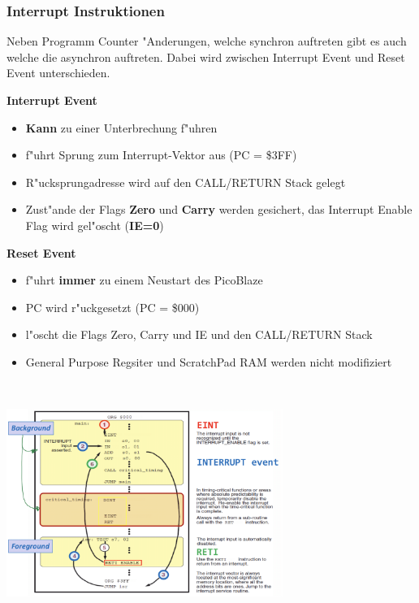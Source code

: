 \subsubsection{Interrupt Instruktionen}
\begin{minipage}{9cm}
	Neben Programm Counter "Anderungen, welche synchron auftreten gibt es auch welche die asynchron auftreten. Dabei wird zwischen Interrupt Event und Reset Event unterschieden.
	
	\textbf{Interrupt Event}
	\begin{itemize}
		\item \textbf{Kann} zu einer Unterbrechung f"uhren
		\item f"uhrt Sprung zum Interrupt-Vektor aus (PC = \$3FF)
		\item R"ucksprungadresse wird auf den CALL/RETURN Stack gelegt
		\item Zust"ande der Flags \textbf{Zero} und \textbf{Carry} werden gesichert, das Interrupt Enable Flag wird gel"oscht (\textbf{IE=0})
	\end{itemize}
	\textbf{Reset Event}
	\begin{itemize}
		\item f"uhrt \textbf{immer} zu einem Neustart des PicoBlaze
		\item PC wird r"uckgesetzt (PC = \$000)
		\item l"oscht die Flags Zero, Carry und IE und den CALL/RETURN Stack
		\item General Purpose Regsiter und ScratchPad RAM werden nicht modifiziert
	\end{itemize}
\end{minipage}
%
\begin{minipage}{0.5cm}
	\ \
\end{minipage}
%
\begin{minipage}{9cm}
	\includegraphics[width=9cm]{pics/Ablauf_Asynchron}
\end{minipage}
\newpage